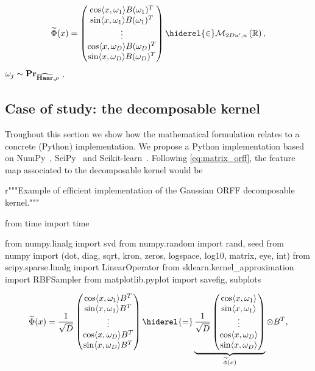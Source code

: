 \begin{dmath}
\label{eq:matrix_orff}
\tildePhi{\omega}(x) = \begin{pmatrix} \cos\inner{x,\omega_1}B(\omega_1)^T \\
\sin\inner{x,\omega_1}B(\omega_1)^T \\
\vdots \\
\cos\inner{x,\omega_D}B(\omega_D)^T \\
\sin\inner{x,\omega_D}B(\omega_D)^T
\end{pmatrix}\hiderel{\in}\mathcal{M}_{2Du',u}\left(\mathbb{R}\right),
\end{dmath}
$\omega_j\sim{\mathbf{{Pr}}}_{\widehat{\mathbf{Haar}}, \rho}$ \iid.
\subsection{Case of study: the decomposable kernel}
Troughout this section we show how the mathematical formulation relates to a concrete (Python) implementation. We propose a Python implementation based on NumPy~\citep{oliphant2006guide}, SciPy~\citep{jones2014scipy} and Scikit-learn~\citep{pedregosa2011scikit}. Following \cref{eq:matrix_orff}, the feature map associated to the decomposable kernel would be
\begin{pycode}
r"""Example of efficient implementation of the Gaussian ORFF decomposable kernel."""

from time import time

from numpy.linalg import svd
from numpy.random import rand, seed
from numpy import (dot, diag, sqrt, kron, zeros,
                   logspace, log10, matrix, eye, int)
from scipy.sparse.linalg import LinearOperator
from sklearn.kernel_approximation import RBFSampler
from matplotlib.pyplot import savefig, subplots
\end{pycode}
\begin{dmath*}
\label{eq:matrix_decomposable_orff}
\tildePhi{\omega}(x) = \frac{1}{\sqrt{D}}\begin{pmatrix} \cos\inner{x,\omega_1}B^T \\
\sin\inner{x,\omega_1}B^T \\
\vdots \\
\cos\inner{x,\omega_D}B^T \\
\sin\inner{x,\omega_D}B^T
\end{pmatrix}
\hiderel{=}
\underbrace{\frac{1}{\sqrt{D}}\begin{pmatrix} \cos\inner{x,\omega_1} \\
\sin\inner{x,\omega_1} \\
\vdots \\
\cos\inner{x,\omega_D} \\
\sin\inner{x,\omega_D}
\end{pmatrix}}_{\tildephi{\omega}(x)}\otimes B^T,
\end{dmath*}
